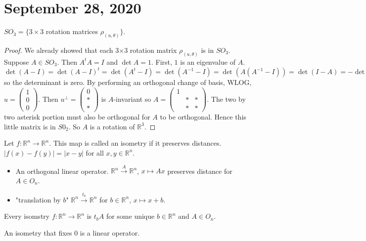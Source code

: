 \documentclass{article}
\newcommand{\R}{\mathbb{R}}
\newcommand{\ra}[1][]{\xrightarrow{#1}}
\begin{document}
\section{September 28, 2020}
\begin{theorem}
$SO_3=\{3\times 3$ rotation matrices $\rho_{(u,\theta)}\}$.
\end{theorem}
\begin{proof}
We already showed that each 3$\times$3 rotation matrix $\rho_{(u,\theta)}$ is in $SO_3$. Suppose $A\in SO_3$. Then $A^tA=I$ and $\det A=1$. First, $1$ is an eigenvalue of $A$.  $\det(A-I)=\det(A-I)^t=\det(A^t-I)=\det(A^{-1}-I)=\det(A(A^{-1}-I))=\det(I-A)=-\det(A-I)$ so the determinant is zero. By performing an orthogonal change of basis, WLOG, $u=\begin{pmatrix}
1\\0\\0
\end{pmatrix}.$ Then $u^\perp=\begin{pmatrix}
0\\*\\*
\end{pmatrix}$ is $A$-invariant so $A=\begin{pmatrix}
1&&\\&*&*\\&*&*
\end{pmatrix}$. The two by two asterisk portion must also be orthogonal for $A$ to be orthogonal. Hence this little matrix is in $S0_2$. So $A$ is a rotation of $\R^3$.
\end{proof}
\begin{definition}
Let $f:\R^n\ra\R^n$. This map is called an isometry if it preserves distances. $|f(x)-f(y)|=|x-y|$ for all $x,y\in \R^n$.
\end{definition}
\begin{example}
\begin{itemize}
    \item An orthogonal linear operator. $\R^n\ra[A]\R^n$, $x\mapsto Ax$ preserves distance for $A\in O_n$.
    \item "translation by $b$" $\R^n\ra[t_b]\R^n$ for $b\in \R^n$, $x\mapsto x+b$.
\end{itemize}
\end{example}
\begin{theorem}
Every isomstry $f:\R^n\ra\R^n$ is $t_bA$ for some unique $b\in \R^n$ and $A\in O_n$.
\end{theorem}
\begin{lemma}
An isometry that fixes 0 is a linear operator.
\end{lemma}
\end{document}
